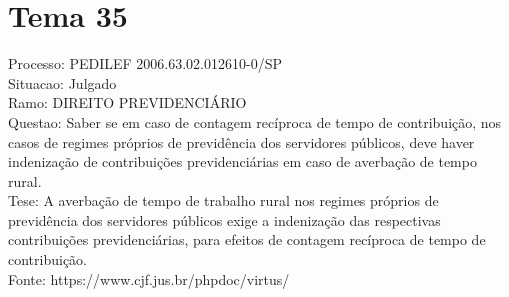 \documentclass[12pt]{article}
\begin{document}
\section*{Tema 35}
Processo: PEDILEF 2006.63.02.012610-0/SP\\
Situacao: Julgado\\
Ramo: DIREITO PREVIDENCIÁRIO\\
Questao: Saber se em caso de contagem recíproca de tempo de contribuição, nos casos de regimes próprios de previdência dos servidores públicos, deve haver indenização de contribuições previdenciárias em caso de averbação de tempo rural.\\
Tese: A averbação de tempo de trabalho rural nos regimes próprios de previdência dos servidores públicos exige a indenização das respectivas contribuições previdenciárias, para efeitos de contagem recíproca de tempo de contribuição.\\
Fonte: https://www.cjf.jus.br/phpdoc/virtus/
\end{document}
